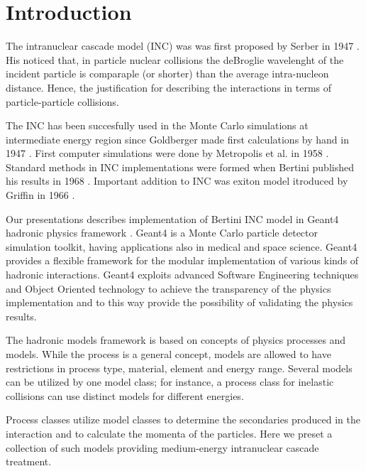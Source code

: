 \section{Introduction}

The intranuclear cascade model (INC) was was first proposed by Serber in 1947 \cite{serber47}.  
His noticed that, in particle nuclear collisions the deBroglie wavelenght of the incident particle is 
comparaple (or shorter) than the average intra-nucleon distance.
Hence, the justification for describing the interactions in terms of particle-particle  collisions.

The INC has been succesfully used in the Monte Carlo simulations at intermediate energy region 
since Goldberger made first calculations by hand in 1947 \cite{goldberger48}. 
First computer simulations were done by Metropolis et al. in 1958 \cite{metropolis58}. 
Standard methods in INC implementations were formed when Bertini published his results in 1968 \cite{bertini68}.
Important addition to INC was exiton model itroduced by Griffin in 1966 \cite{griffin66}. 

Our presentations describes implementation of Bertini INC model in {\sc Geant4} hadronic physics framework \cite{geant4collaboration03}.
Geant4 is a Monte Carlo particle detector simulation toolkit, having applications also in  medical and space
science. 
Geant4 provides a flexible framework for the modular implementation of
various kinds of hadronic interactions. 
Geant4 exploits advanced Software Engineering techniques and Object
Oriented technology to achieve the transparency of the physics
implementation and to this way provide the possibility of validating the
physics results. 

The hadronic models framework is based on concepts of physics
processes and models. While the process is a general concept, models
are allowed to have restrictions in process type, material, element
and energy range.  Several models can be utilized by one model class; for instance, a
process class for inelastic collisions can use distinct models for different energies.


Process classes utilize model classes to determine the
secondaries produced in the interaction and to calculate the momenta
of the particles. Here we preset a collection of such models providing medium-energy
intranuclear cascade treatment.






